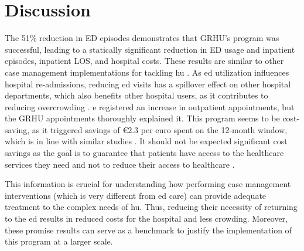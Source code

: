 \documentclass{bmcart}
\begin{document}
\section*{Discussion}
The 51\% reduction in ED episodes demonstrates that GRHU's program was successful, leading to a statically significant reduction in ED usage and inpatient episodes, inpatient LOS, and hospital costs.
These results are similar to other case management implementations for tackling \gls{hu} \cite{grover_case_2018,abello_care_2012}.
As \gls{ed} utilization influences hospital re-admissions, reducing \gls{ed} visits has a spillover effect on other hospital departments, which also benefits other hospital users, as it contributes to reducing overcrowding \cite{navratil-strawn_emergency_2014, shumway_cost-effectiveness_2008}.
e registered an increase in outpatient appointments, but the GRHU appointments thoroughly explained it. 
This program seems to be cost-saving, as it triggered savings of €2.3 per euro spent on the 12-month window, which is in line with similar studies \cite{navratil-strawn_emergency_2014}. 
It should not be expected significant cost savings as the goal is to guarantee that patients have access to the healthcare services they need and not to reduce their access to healthcare \cite{shumway_cost-effectiveness_2008}.
\par This information is crucial for understanding how performing case management interventions (which is very different from \gls{ed} care) can provide adequate treatment to the complex needs of \gls{hu}.
Thus, reducing their necessity of returning to the \gls{ed} results in reduced costs for the hospital and less crowding.
Moreover, these promise results can serve as a benchmark to justify the implementation of this program at a larger scale. 
\end{document}
